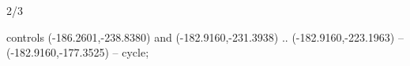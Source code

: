 \begin{flagdescription}{2/3}
\begin{scope}[xshift=0.3483\flagwidth*\stretchfactor]
\begin{scope}[scale=0.00336\flagwidth,xshift=-37mm,yshift=105.5mm]
\begin{scope}[y=0.80pt, x=0.80pt, yscale=-1, xscale=1, inner sep=0pt, outer sep=0pt]
\begin{scope}[draw=dark,miter limit=22.93]
  controls (-186.2601,-238.8380) and (-182.9160,-231.3938) ..
  (-182.9160,-223.1963) -- (-182.9160,-177.3525) -- cycle;
\end{scope}
\end{scope}
\end{scope}
\end{scope}
\fi
\framecode{}
\end{flagdescription}
